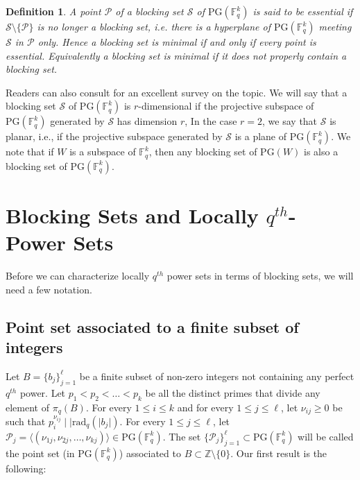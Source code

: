 \documentclass[12pt]{amsart}
\newtheorem{definition}{Definition}
\newcommand{\F}{{\mathbb F}}
\newcommand{\PG}{\mathrm{PG}}
\begin{document}
\begin{definition}
A point $\mathcal{P}$ of a blocking set $\mathcal{S}$ of $\PG(\F_q^k)$ is said to be \textit{essential} if $\mathcal{S} \setminus \{\mathcal{P}\}$ is no longer a blocking set,
i.e. there is a hyperplane of $\PG(\F_q^k)$ meeting $\mathcal{S}$ in $\mathcal{P}$ only. Hence a blocking set is \textit{minimal} if and only if every point is essential. Equivalently a blocking set is minimal if it does not properly contain a blocking set.  
\end{definition}
Readers can also consult \cite{blokhuis2011blocking} for an excellent survey on the topic.
We will say that a blocking set $\mathcal{S}$ of $\PG(\F_{q}^{k})$ is $r$-dimensional if the projective subspace of $\PG(\F_{q}^{k})$ generated by $\mathcal{S}$ has dimension $r$, In the case $r=2$, we say that $\mathcal{S}$ is planar, i.e., if the projective subspace generated by $\mathcal{S}$ is a plane of $\PG(\F_{q}^{k})$.
We note that if $W$ is a subspace of $\F_{q}^{k}$, then any blocking set of $\PG(W)$ is also a blocking set of $\PG(\F_{q}^{k})$.

\section{Blocking Sets and Locally $q^{th}$-Power Sets} \label{section:main}
Before we can characterize locally $q^{th}$ power sets in terms of blocking sets, we will need a few notation. 

\subsection{Point set associated to a finite subset of integers}\label{pointset}
Let $B = \{b_{j}\}_{j=1}^{\ell}$ be a finite subset of non-zero integers not containing any perfect $q^{th}$ power. Let $p_{1} < p_{2} < \ldots < p_{k}$ be all the distinct primes that divide any element of $\pi_{q}(B)$. For every $1 \leq i \leq k$ and for every $1 \leq j \leq \ell$, let $\nu_{ij}\geq 0$ be such that $p_{i}^{\nu_{ij}}\mid\mid \text{rad}_{q}(\lvert b_{j}\rvert)$. For every $1 \leq j \leq \ell$, let $\mathcal{P}_{j} = \langle (\nu_{1j}, \nu_{2j}, \ldots, \nu_{kj})\rangle \in \PG(\F_{q}^{k})$. The set $\{\mathcal{P}_{j}\}_{j=1}^{\ell} \subset\PG(\F_{q}^{k})$ will be called the point set (in $\PG(\F_{q}^{k})$) associated to $B \subset\mathbb{Z}\setminus\{0\}$. Our first result is the following:  
\end{document}

